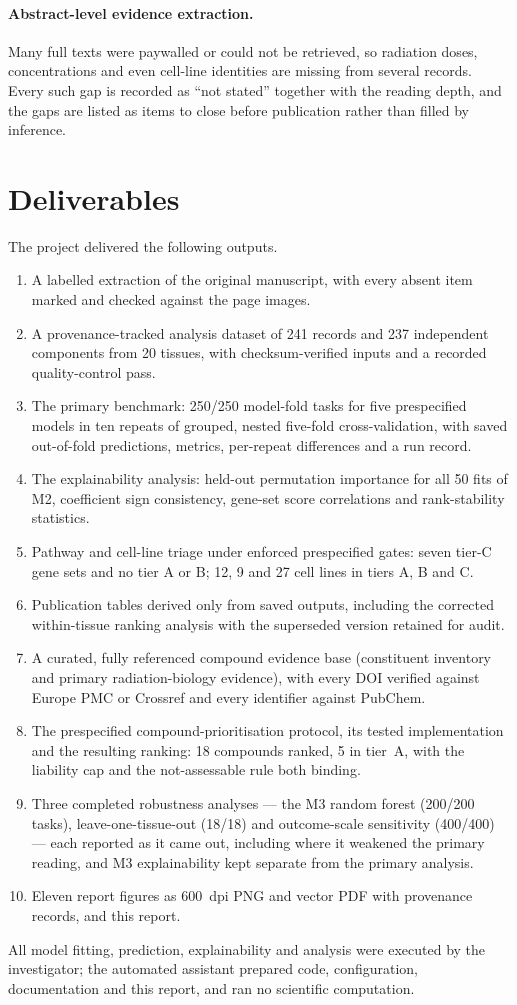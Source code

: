 \paragraph{Abstract-level evidence extraction.} Many full texts were paywalled or could not be
retrieved, so radiation doses, concentrations and even cell-line identities are missing from
several records. Every such gap is recorded as \enquote{not stated} together with the reading
depth, and the gaps are listed as items to close before publication rather than filled by
inference.

\section{Deliverables}\label{sec:deliverables}

The project delivered the following outputs.
\begin{enumerate}
  \item A labelled extraction of the original manuscript, with every absent item marked and
    checked against the page images.
  \item A provenance-tracked analysis dataset of 241 records and 237 independent components
    from 20 tissues, with checksum-verified inputs and a recorded quality-control pass.
  \item The primary benchmark: 250/250 model-fold tasks for five prespecified models in ten
    repeats of grouped, nested five-fold cross-validation, with saved out-of-fold predictions,
    metrics, per-repeat differences and a run record.
  \item The explainability analysis: held-out permutation importance for all 50 fits of M2,
    coefficient sign consistency, gene-set score correlations and rank-stability statistics.
  \item Pathway and cell-line triage under enforced prespecified gates: seven tier-C gene
    sets and no tier A or B; 12, 9 and 27 cell lines in tiers A, B and C.
  \item Publication tables derived only from saved outputs, including the corrected
    within-tissue ranking analysis with the superseded version retained for audit.
  \item A curated, fully referenced compound evidence base (constituent inventory and primary
    radiation-biology evidence), with every DOI verified against Europe PMC or Crossref and
    every identifier against PubChem.
  \item The prespecified compound-prioritisation protocol, its tested implementation and the
    resulting ranking: 18 compounds ranked, 5 in tier~A, with the liability cap and the
    not-assessable rule both binding.
  \item Three completed robustness analyses --- the M3 random forest (200/200 tasks),
    leave-one-tissue-out (18/18) and outcome-scale sensitivity (400/400) --- each reported as
    it came out, including where it weakened the primary reading, and M3 explainability kept
    separate from the primary analysis.
  \item Eleven report figures as 600~dpi PNG and vector PDF with provenance records, and this
    report.
\end{enumerate}
All model fitting, prediction, explainability and analysis were executed by the
investigator; the automated assistant prepared code, configuration, documentation and this
report, and ran no scientific computation.
